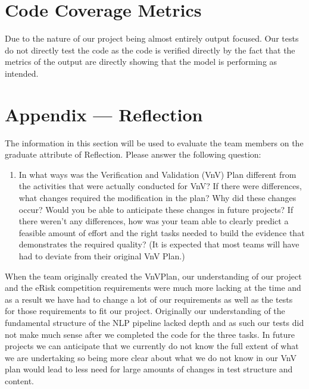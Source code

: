 \documentclass[12pt, titlepage]{article}
\begin{document}
\section{Code Coverage Metrics}
Due to the nature of our project being almost entirely output focused. Our tests do not directly test the code as the code is verified directly by the fact that the metrics of the output are directly showing that the model is performing as intended.






\newpage{}
\section*{Appendix --- Reflection}


The information in this section will be used to evaluate the team members on the
graduate attribute of Reflection.  Please answer the following question:


\begin{enumerate}
 \item In what ways was the Verification and Validation (VnV) Plan different
 from the activities that were actually conducted for VnV?  If there were
 differences, what changes required the modification in the plan?  Why did
 these changes occur?  Would you be able to anticipate these changes in future
 projects?  If there weren't any differences, how was your team able to clearly
 predict a feasible amount of effort and the right tasks needed to build the
 evidence that demonstrates the required quality?  (It is expected that most
 teams will have had to deviate from their original VnV Plan.)
\end{enumerate}


When the team originally created the VnVPlan, our understanding of our project and the eRisk competition requirements were much more lacking at the time and as a result we have had to change a lot of our requirements as well as the tests for those requirements to fit our project. Originally our understanding of the fundamental structure of the NLP pipeline lacked depth and as such our tests did not make much sense after we completed the code for the three tasks. In future projects we can anticipate that we currently do not know the full extent of what we are undertaking so being more clear about what we do not know in our VnV plan would lead to less need for large amounts of changes in test structure and content.
\end{document}
